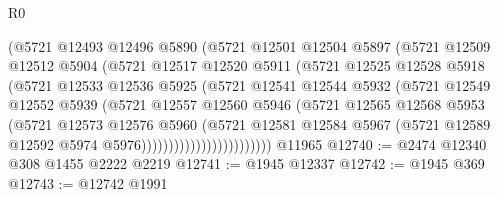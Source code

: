 \begin{lexlean}{R0}
\begin{coremodule}
                          (@5721
                            @12493
                            @12496
                            @5890
                            (@5721
                              @12501
                              @12504
                              @5897
                              (@5721
                                @12509
                                @12512
                                @5904
                                (@5721
                                  @12517
                                  @12520
                                  @5911
                                  (@5721
                                    @12525
                                    @12528
                                    @5918
                                    (@5721
                                      @12533
                                      @12536
                                      @5925
                                      (@5721
                                        @12541
                                        @12544
                                        @5932
                                        (@5721
                                          @12549
                                          @12552
                                          @5939
                                          (@5721
                                            @12557
                                            @12560
                                            @5946
                                            (@5721
                                              @12565
                                              @12568
                                              @5953
                                              (@5721
                                                @12573
                                                @12576
                                                @5960
                                                (@5721
                                                  @12581
                                                  @12584
                                                  @5967
                                                  (@5721
                                                    @12589
                                                    @12592
                                                    @5974
                                                    @5976))))))))))))))))))))))))
    @11965
@12740 := @2474 @12340 @308 @1455 @2222 @2219
@12741 := @1945 @12337
@12742 := @1945 @369
@12743 := @12742 @1991

\end{coremodule}
\end{lexlean}
